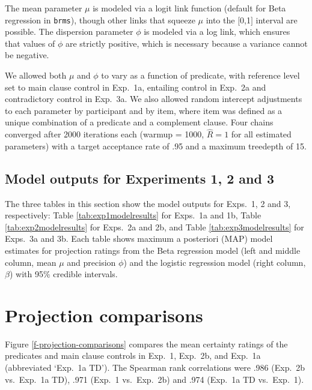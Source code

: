 \documentclass[11pt,fleqn]{article}
\newcommand{\6}{\mbox{$[\hspace*{-.6mm}[$}}
\newcommand{\9}{\mbox{$]\hspace*{-.6mm}]$}}
\begin{document}
The mean parameter $\mu$ is modeled via a logit link function (default for Beta regression in \verb|brms|), though other links that squeeze $\mu$ into the $[$0,1$]$ interval are possible. The dispersion parameter $\phi$ is modeled via a log link, which ensures that values of $\phi$ are strictly positive, which is necessary because a variance cannot be negative. 

We allowed both $\mu$ and $\phi$ to vary as a function of predicate, with reference level set to main clause control in Exp.~1a, entailing control in Exp.~2a and contradictory control in Exp.~3a. We also allowed random intercept adjustments to each parameter by participant and by item, where item was defined as a unique combination of a predicate and a complement clause. Four chains converged after 2000 iterations each (warmup = 1000, \(\hat{R}=1\) for all estimated parameters) with a target acceptance rate of .95 and a maximum treedepth of 15.

\subsection{Model outputs for Experiments 1, 2 and 3}\label{a-mo}

The three tables in this section show the model outputs for Exps.~1, 2 and 3, respectively: Table \ref{tab:exp1modelresults} for Exps.~1a and 1b, Table \ref{tab:exp2modelresults} for Exps.~2a and 2b, and Table \ref{tab:exp3modelresults} for Exps.~3a and 3b. Each table shows maximum a posteriori (MAP) model estimates for projection ratings from the Beta regression model (left and middle column, mean $\mu$ and precision $\phi$) and the logistic regression model (right column, $\beta$)  with 95\% credible intervals.

\section{Projection comparisons}\label{a-comparison}

Figure \ref{f-projection-comparisons} compares the mean certainty ratings of the predicates and main clause controls in Exp.~1, Exp.~2b, and  Exp.~1a (abbreviated `Exp.~1a TD'). The Spearman rank correlations were .986 (Exp.~2b vs.\ Exp.~1a TD), .971 (Exp.~1 vs.\ Exp.~2b) and .974 (Exp.~1a TD vs.\  Exp.~1).
\end{document}

